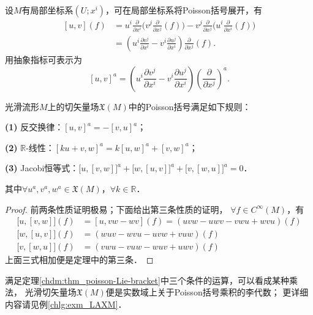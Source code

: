 设$M$有局部坐标系$(U;x^i)$，可在局部坐标系将Poisson括号展开，有
\begin{equation}\label{chdm:eqn_poisson-bracket-expand}
\begin{aligned}
    \left[u,v\right] (f) &= u^i\frac{\partial }{\partial x^i}\bigl(v^j\frac{\partial }{\partial x^j}(f)\bigr)
       - v^j\frac{\partial }{\partial x^j}\bigl(u^i\frac{\partial }{\partial x^i}(f)\bigr) \\
     &=  \left( u^i\frac{\partial v^j}{\partial x^i} 
       - v^i\frac{\partial u^j}{\partial x^i} \right)  \frac{\partial }{\partial x^j} (f) .
\end{aligned}
\end{equation}
用抽象指标可表示为
\begin{equation}\label{chdm:eqn_poisson-bracket-expand-ai}
        \left[u,v\right]^a =  \left( u^i\frac{\partial v^j}{\partial x^i} 
        - v^i\frac{\partial u^j}{\partial x^i} \right)  
        \left(\frac{\partial }{\partial x^j}\right)^a  .
\end{equation}

\begin{theorem}\label{chdm:thm_poisson-Lie-bracket}
    光滑流形$M$上的切矢量场$\mathfrak{X}(M)$中的Poisson括号满足如下规则：
    
    {\bfseries (1)} 反交换律：$\left[u,v\right]^a = -\left[v,u\right]^a$；
    
    {\bfseries (2)} $\mathbb{R}$-线性：$\left[k u+ v,w\right]^a = k \left[u,w\right]^a +\left[v,w\right]^a$；
    
    {\bfseries (3)} Jacobi恒等式：$\bigl[u, [v,w]\bigr]^a+\bigl[w, [u,v]\bigr]^a+\bigl[v, [w,u]\bigr]^a=0$．
    
    其中$\forall u^a,v^a,w^a \in \mathfrak{X}(M)$，$ \forall k \in \mathbb{R}$．
\end{theorem}
\begin{proof}
    前两条性质证明极易；下面给出第三条性质的证明，
    $\forall f\in C^\infty (M)$，有
    \begin{align*}
        \bigl[u, [v,w]\bigr](f) & =[u, vw-wv](f)=(uvw-uwv-vwu+wvu)(f) \\
        \bigl[w, [u,v]\bigr](f) & =(wuv-wvu-uvw+vuw)(f) \\
        \bigl[v, [w,u]\bigr](f) & =(vwu-vuw-wuv+uwv)(f)
    \end{align*}
    上面三式相加便是定理中的第三条．
\end{proof}
满足定理\ref{chdm:thm_poisson-Lie-bracket}中三个条件的运算，可以看成某种乘法，
光滑切矢量场$\mathfrak{X}(M)$便是实数域上关于Poisson括号乘积的{\heiti 李代数}；
更详细内容请见例\ref{chlg:exm_LAXM}． %

